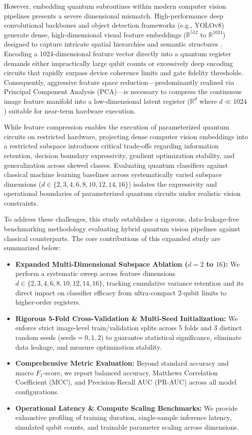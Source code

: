 \documentclass[10pt,twocolumn,letterpaper]{article}
\begin{document}
However, embedding quantum subroutines within modern computer vision pipelines presents a severe dimensional mismatch. High-performance deep convolutional backbones and object detection frameworks (e.g., YOLOv8) generate dense, high-dimensional visual feature embeddings ($\mathbb{R}^{512}$ to $\mathbb{R}^{1024}$) designed to capture intricate spatial hierarchies and semantic structures \cite{ref2}. Encoding a 1024-dimensional feature vector directly into a quantum register demands either impractically large qubit counts or excessively deep encoding circuits that rapidly surpass device coherence limits and gate fidelity thresholds. Consequently, aggressive feature space reduction—predominantly realized via Principal Component Analysis (PCA)—is necessary to compress the continuous image feature manifold into a low-dimensional latent register ($\mathbb{R}^d$ where $d \ll 1024$) suitable for near-term hardware execution.

While feature compression enables the execution of parameterized quantum circuits on restricted hardware, projecting dense computer vision embeddings into a restricted subspace introduces critical trade-offs regarding information retention, decision boundary expressivity, gradient optimization stability, and generalization across skewed classes. Evaluating quantum classifiers against classical machine learning baselines across systematically varied subspace dimensions ($d \in \{2, 3, 4, 6, 8, 10, 12, 14, 16\}$) isolates the expressivity and operational boundaries of parameterized quantum circuits under realistic vision constraints.

To address these challenges, this study establishes a rigorous, data-leakage-free benchmarking methodology evaluating hybrid quantum vision pipelines against classical counterparts. The core contributions of this expanded study are summarized below:
\begin{itemize}
    \item \textbf{Expanded Multi-Dimensional Subspace Ablation ($d = 2$ to $16$):} We perform a systematic sweep across feature dimensions $d \in \{2, 3, 4, 6, 8, 10, 12, 14, 16\}$, tracking cumulative variance retention and its direct impact on classifier efficacy from ultra-compact 2-qubit limits to higher-order registers.
    \item \textbf{Rigorous 5-Fold Cross-Validation \& Multi-Seed Initialization:} We enforce strict image-level train/validation splits across 5 folds and 3 distinct random seeds ($\text{seeds}=0, 1, 2$) to guarantee statistical significance, eliminate data leakage, and measure optimization stability.
    \item \textbf{Comprehensive Metric Evaluation:} Beyond standard accuracy and macro $F_1$-score, we report balanced accuracy, Matthews Correlation Coefficient (MCC), and Precision-Recall AUC (PR-AUC) across all model configurations.
    \item \textbf{Operational Latency \& Compute Scaling Benchmarks:} We provide exhaustive profiling of training duration, single-sample inference latency, simulated qubit counts, and trainable parameter scaling across dimensions.
\end{itemize}
\end{document}

